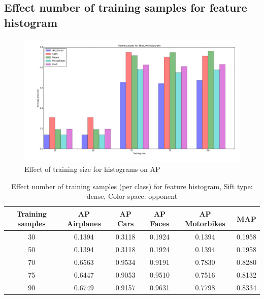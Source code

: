 \subsection{Effect number of training samples for feature histogram}
\begin{figure}[H]
\includegraphics[scale=0.40]{plots/training_size_feature_histograms}
\caption{Effect of training size for histograms on AP}
\end{figure}
\begin{table}[H]
\begin{tabular}{|c|ccccc|}
\hline
\textbf{Training samples} & \textbf{AP Airplanes} & \textbf{AP Cars} & \textbf{AP Faces} & \textbf{AP Motorbikes} & \textbf{MAP}\\
\hline
30 & 0.1394 & 0.3118& 0.1924& 0.1394 & 0.1958\\
50 & 0.1394 & 0.3118& 0.1924& 0.1394 & 0.1958\\
70 & 0.6563 & 0.9534 & 0.9191 & 0.7830 & 0.8280\\
75 & 0.6447 & 0.9053 & 0.9510 & 0.7516 & 0.8132\\
90 & 0.6749 & 0.9157 & 0.9631 & 0.7798 & 0.8334\\
\hline
\end{tabular}
\caption{Effect number of training samples (per class) for feature histogram, Sift type: dense, Color space: opponent}
\end{table}


